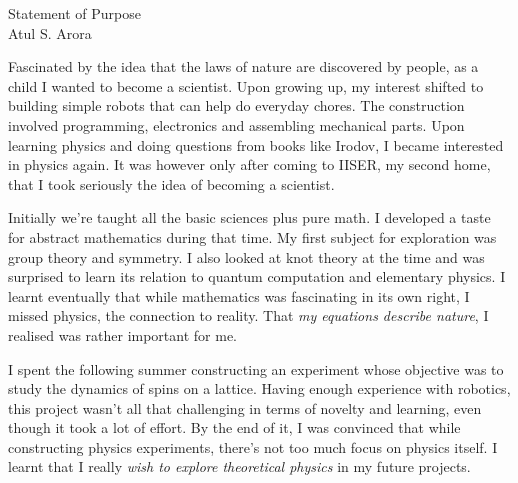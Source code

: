\setlength{\oddsidemargin}{-0.4in}
\setlength{\evensidemargin}{0in}
\setlength{\textwidth}{7.0in}
\setlength{\topmargin}{-1.1in}
\setlength{\textheight}{11in}
\pagestyle{empty}



\begin{center}
{\Large Statement of Purpose} \\[.1in]
{\large Atul S. Arora}
\end{center}

\vspace*{.1in}
Fascinated by the idea that the laws of nature are discovered by people, as a child I wanted to become a scientist. Upon growing up, my interest shifted to building simple robots that can help do everyday chores. The construction involved programming, electronics and assembling mechanical parts. Upon learning physics and doing questions from books like Irodov, I became interested in physics again. It was however only after coming to IISER, my second home, that I took seriously the idea of becoming a scientist. 


Initially we're taught all the basic sciences plus pure math. I developed a taste for abstract mathematics during that time. My first subject for exploration was group theory and symmetry. I also looked at knot theory at the time and was surprised to learn its relation to quantum computation and elementary physics. I learnt eventually that while mathematics was fascinating in its own right, I missed physics, the connection to reality. That \emph{my equations describe nature}, I realised was rather important for me.


I spent the following summer constructing an experiment whose objective was to study the dynamics of spins on a lattice. Having enough experience with robotics, this project wasn't all that challenging in terms of novelty and learning, even though it took a lot of effort. %
By the end of it, I was convinced that while constructing physics experiments, there's not too much focus on physics itself. I learnt that I really \emph{wish to explore theoretical physics} in my future projects.


